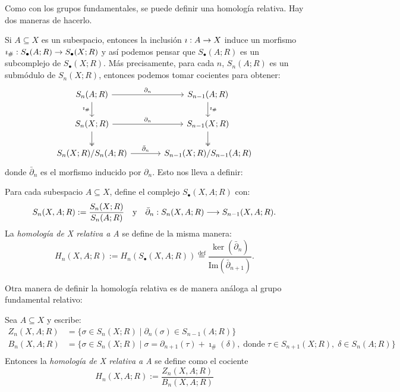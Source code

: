 \documentclass[../../topologia_algebraica]{subfiles}
\begin{document}
Como con los grupos fundamentales, se puede definir una homolog\'ia relativa. Hay dos maneras de hacerlo.

Si $A\subseteq X$ es un subespacio, entonces la inclusi\'on $\imath:A\rightarrow X$ induce un morfismo
$\imath_{\#}:S_{\bullet}(A;R)\rightarrow S_{\bullet}(X;R)$ y as\'i podemos pensar que $S_{\bullet}(A;R)$
es un subcomplejo de $S_{\bullet}(X;R)$. M\'as precisamente, para cada $n$, $S_n(A;R)$ es un
subm\'odulo de $S_n(X;R)$, entonces podemos tomar cocientes para obtener:
\[
  \begin{tikzcd}[column sep=large]
    S_n(A;R) \arrow[r,"\partial_n"] \arrow[d,"\imath_{\#}"'] & S_{n-1}(A;R) \arrow[d,"\imath_{\#}"] \\
    S_n(X;R) \arrow[r,"\partial_n"] \arrow[d,two heads] & S_{n-1}(X;R) \arrow[d,two heads] \\
    S_n(X;R)/S_n(A;R) \arrow[r,"\bar{\partial}_n"] & S_{n-1}(X;R)/S_{n-1}(A;R)
  \end{tikzcd}
\]
donde $\bar{\partial}_n$ es el morfismo inducido por $\partial_n$. Esto nos lleva a definir:

\begin{defin}\label{def:homologia_relativa_1}
  Para cada subespacio $A\subseteq X$, define el complejo $S_{\bullet}(X,A;R)$ con:
  \[
    S_n(X,A;R):=\frac{S_n(X;R)}{S_n(A;R)} \quad\text{y}\quad \bar{\partial}_n:S_n(X,A;R)\longrightarrow S_{n-1}(X,A;R).
  \]
  La \emph{homolog\'ia de X relativa a A} se define de la misma manera:
  \[
    H_n(X,A;R):=H_n(S_{\bullet}(X,A;R))\stackrel{\text{def}}{=}
    \frac{\ker(\bar{\partial}_n)}{\text{Im}(\bar{\partial}_{n+1})}.
  \]
\end{defin}

Otra manera de definir la homolog\'ia relativa es de manera an\'aloga al grupo fundamental relativo:

\begin{defin}\label{def:homologia_relativa_2}
  Sea $A\subseteq X$ y escribe:
  \begin{align*}
    Z_n(X,A;R)&=\{\sigma\in S_n(X;R) \mid \partial_n(\sigma)\in S_{n-1}(A;R)\} \\
    B_n(X,A;R)&=\{\sigma\in S_n(X;R) \mid \sigma=
    \partial_{n+1}(\tau)+\imath_{\#}(\delta),\;\text{donde}\; \tau\in S_{n+1}(X;R),\;\delta\in S_n(A;R)\} \\
  \end{align*}
  Entonces la \emph{homolog\'ia de X relativa a A} se define como el cociente
  \[
    H_n(X,A;R):=\frac{Z_n(X,A;R)}{B_n(X,A;R)}
  \]
\end{defin}
\end{document}
